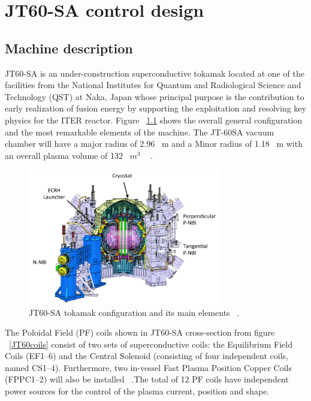 \chapter{JT60-SA control design}

\section{Machine description}

JT60-SA is an under-construction superconductive tokamak located at one of the facilities from the National Institutes for Quantum and Radiological Science and Technology (QST)  at  Naka, Japan whose principal purpose is  the contribution to early realization of fusion energy by supporting the exploitation and resolving key physics for the ITER reactor. Figure ~\ref{JT60schm} shows the overall general configuration and the most remarkable elements of the machine. The JT-60SA  vacuum chamber will have a major radius of 2.96~ m and a Minor radius of 1.18~ m with an overall plasma volume of 132~ $m^3$ ~\cite{Spears2014} .
\smallskip

\begin{figure}[h]
	\centering
	\includegraphics[width=0.75\textwidth]{Chp3/JT60SA.png}
	
	\caption{\label{JT60schm}JT60-SA tokamak configuration and its main elements ~\cite{JT60SA:ResearchPlan}.}
\end{figure}

The Poloidal Field (PF) coils shown in JT60-SA cross-section from figure ~\ref{JT60coils} consist of two sets of superconductive coils: the Equilibrium Field Coils (EF1–6) and the Central Solenoid (consisting of four independent coils, named CS1–4). Furthermore, two in-vessel Fast Plasma Position Copper Coils (FPPC1–2) will also be installed ~\cite{NCruz}.The total of 12 PF coils have independent power sources for the control of the plasma current, position and shape.   
\smallskip

